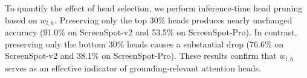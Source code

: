 To quantify the effect of head selection, we perform inference-time head pruning based on $w_{l,h}$. Preserving only the top 30\% heads produces nearly unchanged accuracy (91.0\% on ScreenSpot-v2 and 53.5\% on ScreenSpot-Pro). In contrast, preserving only the bottom 30\% heads causes a substantial drop (76.6\% on ScreenSpot-v2 and 38.1\% on ScreenSpot-Pro). These results confirm that $w_{l,h}$ serves as an effective indicator of grounding-relevant attention heads. 